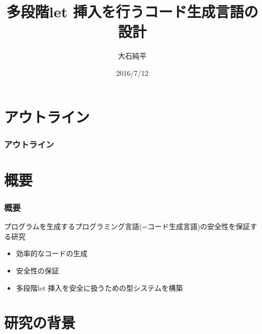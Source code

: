 \documentclass[dvipdfmx,cjk,xcolor=dvipsnames,envcountsect,notheorems,12pt]{beamer}
\title{多段階let 挿入を行うコード生成言語の設計}
\author{大石純平}
\institute[筑波大学 プログラム論理研究室]{筑波大学 大学院 \\ プログラム論理研究室}%
\date{2016/7/12}
\theoremstyle{definition}
\begin{document}
\frame[plain]{\titlepage}%

\section*{アウトライン}

\begin{frame}
  \frametitle{アウトライン}
  \tableofcontents[sectionstyle=show,subsectionstyle=hide]
\end{frame}

\section{概要}

\begin{frame}
  \frametitle{概要}
  プログラムを生成するプログラミング言語(=\alert{コード生成言語})の安全性を保証する研究
  \begin{itemize}
  \item<2-> 効率的なコードの生成
  \item<3-> 安全性の保証
  \item<4-> [⇒] \alert{多段階let 挿入}を安全に扱うための型システムを構築
  \end{itemize}
\end{frame}

\section{研究の背景}
\end{document}
